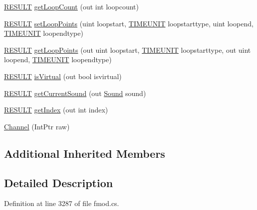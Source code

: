 \begin{DoxyCompactItemize}
\item 
\hyperlink{namespace_f_m_o_d_a305d1176ef3f8c8815861a60407ac33d}{R\+E\+S\+U\+LT} \hyperlink{class_f_m_o_d_1_1_channel_a1425a8a1ebcb30e16247b1bb3f52817f}{get\+Loop\+Count} (out int loopcount)
\item 
\hyperlink{namespace_f_m_o_d_a305d1176ef3f8c8815861a60407ac33d}{R\+E\+S\+U\+LT} \hyperlink{class_f_m_o_d_1_1_channel_af10289a5935c20e113db049b714965d0}{set\+Loop\+Points} (uint loopstart, \hyperlink{namespace_f_m_o_d_aff20975332f93ff2180d2681cb43929f}{T\+I\+M\+E\+U\+N\+IT} loopstarttype, uint loopend, \hyperlink{namespace_f_m_o_d_aff20975332f93ff2180d2681cb43929f}{T\+I\+M\+E\+U\+N\+IT} loopendtype)
\item 
\hyperlink{namespace_f_m_o_d_a305d1176ef3f8c8815861a60407ac33d}{R\+E\+S\+U\+LT} \hyperlink{class_f_m_o_d_1_1_channel_a837e94996edef239d52962943e65cecf}{get\+Loop\+Points} (out uint loopstart, \hyperlink{namespace_f_m_o_d_aff20975332f93ff2180d2681cb43929f}{T\+I\+M\+E\+U\+N\+IT} loopstarttype, out uint loopend, \hyperlink{namespace_f_m_o_d_aff20975332f93ff2180d2681cb43929f}{T\+I\+M\+E\+U\+N\+IT} loopendtype)
\item 
\hyperlink{namespace_f_m_o_d_a305d1176ef3f8c8815861a60407ac33d}{R\+E\+S\+U\+LT} \hyperlink{class_f_m_o_d_1_1_channel_af4006487a422ae9f7ee211c417879ed8}{is\+Virtual} (out bool isvirtual)
\item 
\hyperlink{namespace_f_m_o_d_a305d1176ef3f8c8815861a60407ac33d}{R\+E\+S\+U\+LT} \hyperlink{class_f_m_o_d_1_1_channel_a27a165d8a508e68191a8a544bb310aba}{get\+Current\+Sound} (out \hyperlink{class_f_m_o_d_1_1_sound}{Sound} sound)
\item 
\hyperlink{namespace_f_m_o_d_a305d1176ef3f8c8815861a60407ac33d}{R\+E\+S\+U\+LT} \hyperlink{class_f_m_o_d_1_1_channel_af87fdd737e5b5fe294660a892d33d232}{get\+Index} (out int index)
\item 
\hyperlink{class_f_m_o_d_1_1_channel_a48f307ca43520fbdcc11a616507d6fde}{Channel} (Int\+Ptr raw)
\end{DoxyCompactItemize}
\subsection*{Additional Inherited Members}


\subsection{Detailed Description}


Definition at line 3287 of file fmod.\+cs.



